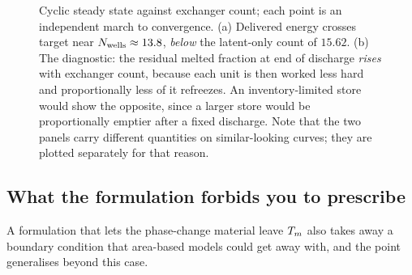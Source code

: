 \begin{figure}[htbp]
\centering
{}
\caption{Cyclic steady state against exchanger count; each point is an
independent march to convergence. (a) Delivered energy crosses target near
$N_{\mathrm{wells}}\approx13.8$, \emph{below} the latent-only count of $15.62$.
(b) The diagnostic: the
residual melted fraction at end of discharge \emph{rises} with exchanger count,
because each unit is then worked less hard and proportionally less of it
refreezes. An inventory-limited store would show the opposite, since a larger
store would be proportionally emptier after a fixed discharge. Note that the two
panels carry different quantities on similar-looking curves; they are plotted
separately for that reason.}
\label{fig:cssdesign}
\end{figure}


\subsection{What the formulation forbids you to prescribe}
\label{sec:prescribe}

A formulation that lets the phase-change material leave $T_{m}$ also takes away a
boundary condition that area-based models could get away with, and the point
generalises beyond this case.


